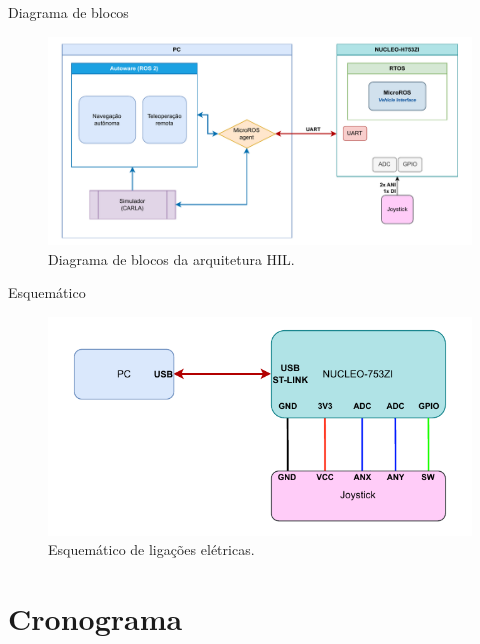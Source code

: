 \documentclass{if-beamer}
\begin{document}
\begin{frame}{Diagrama de blocos}


	
	\begin{figure}
		\centering
		\includegraphics[width=\linewidth]{img/block_diagram.pdf}
		\caption{Diagrama de blocos da arquitetura HIL.}
		\label{fig:blockdiagram}
	\end{figure}
	

\end{frame}


\begin{frame}{Esquemático}
	
		
	\begin{figure}
		\centering
		\includegraphics[width=\linewidth]{img/esquematico.pdf}
		\caption{Esquemático de ligações elétricas.}
		\label{fig:esquematico}
	\end{figure}
	
\end{frame}



\section{Cronograma}
\end{document}
